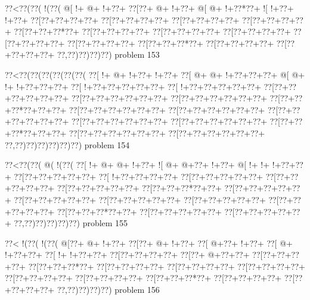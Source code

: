 \vbox{\vbox{\goo
\0??<\0??(\0??(\- !(\0??(
\- @[\- !+\- @+\- !+\0??+
\0??[\0??+\- @+\- !+\0??+
\- @[\- @+\- !+\0??*\0??+
\- ![\- !+\0??+\- !+\0??+
\0??[\0??+\0??+\0??+\0??+
\0??[\0??+\0??+\0??+\0??+
\0??[\0??+\0??+\0??+\0??+
\0??[\0??+\0??+\0??+\0??+
\0??[\0??+\0??+\0??*\0??+
\0??[\0??+\0??+\0??+\0??+
\0??[\0??+\0??+\0??+\0??+
\0??[\0??+\0??+\0??+\0??+
\0??[\0??+\0??+\0??+\0??+
\0??[\0??+\0??+\0??+\0??+
\0??[\0??+\0??+\0??*\0??+
\0??[\0??+\0??+\0??+\0??+
\0??[\0??+\0??+\0??+\0??+
\0??,\0??)\0??)\0??)\0??)
}
\hfil problem 153\hfil\break
}

\vbox{\vbox{\goo
\0??<\0??(\0??(\0??(\0??(\0??(\0??(
\0??[\- !+\- @+\- !+\0??+\- !+\0??+
\0??[\- @+\- @+\- !+\0??+\0??+\0??+
\- @[\- @+\- !+\- !+\0??+\0??+\0??+
\0??[\- !+\0??+\0??+\0??+\0??+\0??+
\0??[\- !+\0??+\0??+\0??+\0??+\0??+
\0??[\0??+\0??+\0??+\0??+\0??+\0??+
\0??[\0??+\0??+\0??+\0??+\0??+\0??+
\0??[\0??+\0??+\0??+\0??+\0??+\0??+
\0??[\0??+\0??+\0??*\0??+\0??+\0??+
\0??[\0??+\0??+\0??+\0??+\0??+\0??+
\0??[\0??+\0??+\0??+\0??+\0??+\0??+
\0??[\0??+\0??+\0??+\0??+\0??+\0??+
\0??[\0??+\0??+\0??+\0??+\0??+\0??+
\0??[\0??+\0??+\0??+\0??+\0??+\0??+
\0??[\0??+\0??+\0??*\0??+\0??+\0??+
\0??[\0??+\0??+\0??+\0??+\0??+\0??+
\0??[\0??+\0??+\0??+\0??+\0??+\0??+
\0??,\0??)\0??)\0??)\0??)\0??)\0??)
}
\hfil problem 154\hfil\break
}

\vbox{\vbox{\goo
\0??<\0??(\0??(\- @(\- !(\0??(
\0??[\- !+\- @+\- @+\- !+\0??+
\- ![\- @+\- @+\0??+\- !+\0??+
\- @[\- !+\- !+\- !+\0??+\0??+
\0??[\0??+\0??+\0??+\0??+\0??+
\0??[\- !+\0??+\0??+\0??+\0??+
\0??[\0??+\0??+\0??+\0??+\0??+
\0??[\0??+\0??+\0??+\0??+\0??+
\0??[\0??+\0??+\0??+\0??+\0??+
\0??[\0??+\0??+\0??*\0??+\0??+
\0??[\0??+\0??+\0??+\0??+\0??+
\0??[\0??+\0??+\0??+\0??+\0??+
\0??[\0??+\0??+\0??+\0??+\0??+
\0??[\0??+\0??+\0??+\0??+\0??+
\0??[\0??+\0??+\0??+\0??+\0??+
\0??[\0??+\0??+\0??*\0??+\0??+
\0??[\0??+\0??+\0??+\0??+\0??+
\0??[\0??+\0??+\0??+\0??+\0??+
\0??,\0??)\0??)\0??)\0??)\0??)
}
\hfil problem 155\hfil\break
}

\vbox{\vbox{\goo
\0??<\- !(\0??(\- !(\0??(
\- @[\0??+\- @+\- !+\0??+
\0??[\0??+\- @+\- !+\0??+
\0??[\- @+\0??+\- !+\0??+
\0??[\- @+\- !+\0??+\0??+
\0??[\- !+\- !+\0??+\0??+
\0??[\0??+\0??+\0??+\0??+
\0??[\0??+\- @+\0??+\0??+
\0??[\0??+\0??+\0??+\0??+
\0??[\0??+\0??+\0??*\0??+
\0??[\0??+\0??+\0??+\0??+
\0??[\0??+\0??+\0??+\0??+
\0??[\0??+\0??+\0??+\0??+
\0??[\0??+\0??+\0??+\0??+
\0??[\0??+\0??+\0??+\0??+
\0??[\0??+\0??+\0??*\0??+
\0??[\0??+\0??+\0??+\0??+
\0??[\0??+\0??+\0??+\0??+
\0??,\0??)\0??)\0??)\0??)
}
\hfil problem 156\hfil\break
}

